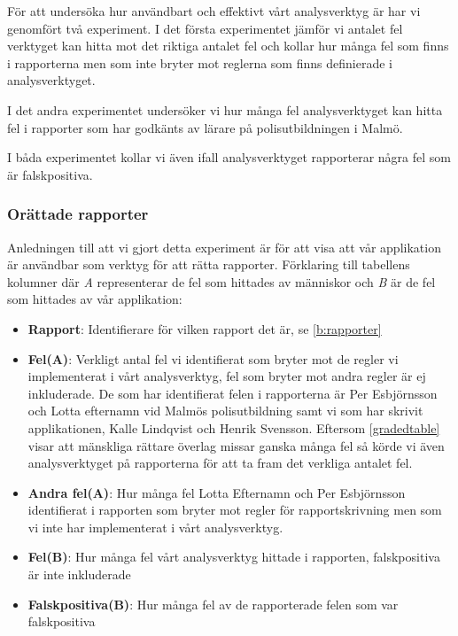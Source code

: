 \documentclass[swedish]{maucsthesis}
\begin{document}
För att undersöka hur användbart och effektivt vårt analysverktyg är har vi genomfört två experiment.
I det första experimentet jämför vi antalet fel verktyget kan hitta mot det riktiga
antalet fel och kollar hur många fel som finns i rapporterna men som inte bryter mot
reglerna som finns definierade i analysverktyget. 

I det andra experimentet undersöker vi hur många fel analysverktyget kan hitta fel i rapporter
som har godkänts av lärare på polisutbildningen i Malmö.

I båda experimentet kollar vi även ifall analysverktyget rapporterar några fel som är
falskpositiva.

\subsubsection{Orättade rapporter}

Anledningen till att vi gjort detta experiment är för att visa att vår applikation är användbar som verktyg för att rätta rapporter.
Förklaring till tabellens kolumner där \textit{A} representerar de fel som hittades av människor och \textit{B} är de fel
som hittades av vår applikation:

\begin{itemize}
\item \textbf{Rapport}: Identifierare för vilken rapport det är, se \cref{b:rapporter}
\item \textbf{Fel(A)}: Verkligt antal fel vi identifierat som bryter mot de regler vi implementerat i vårt analysverktyg, fel som bryter mot andra regler är ej inkluderade. De som har identifierat felen i rapporterna är Per Esbjörnsson och Lotta efternamn vid Malmös polisutbildning samt vi som har skrivit applikationen, Kalle Lindqvist och Henrik Svensson. Eftersom \cref{gradedtable} visar att mänskliga rättare överlag missar ganska många fel så körde vi även analysverktyget på rapporterna för att ta fram det verkliga antalet fel.
\item \textbf{Andra fel(A)}: Hur många fel Lotta Efternamn och Per Esbjörnsson identifierat i rapporten som bryter mot regler för rapportskrivning men som vi inte har implementerat i vårt analysverktyg.
\item \textbf{Fel(B)}: Hur många fel vårt analysverktyg hittade i rapporten, falskpositiva är inte inkluderade
\item \textbf{Falskpositiva(B)}: Hur många fel av de rapporterade felen som var falskpositiva
\end{itemize}
\end{document}
